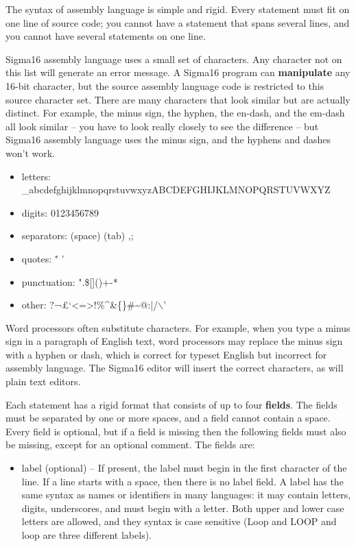 \documentclass[11pt]{article}
\begin{document}
\begin{itemize}
The syntax of assembly language is simple and rigid.  Every statement
must fit on one line of source code; you cannot have a statement that
spans several lines, and you cannot have several statements on one
line.

Sigma16 assembly language uses a small set of characters.  Any
character not on this list will generate an error message.  A Sigma16
program can \textbf{manipulate} any 16-bit character, but the source assembly
language code is restricted to this source character set.  There are
many characters that look similar but are actually distinct.  For
example, the minus sign, the hyphen, the en-dash, and the em-dash all
look similar -- you have to look really closely to see the difference
-- but Sigma16 assembly language uses the minus sign, and the hyphens
and dashes won't work.

\begin{itemize}
\item letters: \_abcdefghijklmnopqrstuvwxyzABCDEFGHIJKLMNOPQRSTUVWXYZ
\item digits: 0123456789
\item separators: (space) (tab) ,;
\item quotes: " '
\item punctuation: ".\$[]()+-*
\item other: ?¬£`<=>!\%\^{}\&\{\}\#\textasciitilde{}@:|/$\backslash$'
\end{itemize}

Word processors often substitute characters.  For example, when you
type a minus sign in a paragraph of English text, word processors may
replace the minus sign with a hyphen or dash, which is correct for
typeset English but incorrect for assembly language.  The Sigma16
editor will insert the correct characters, as will plain text editors.

Each statement has a rigid format that consists of up to four
\textbf{fields}.  The fields must be separated by one or more spaces, and a
field cannot contain a space.  Every field is optional, but if a field
is missing then the following fields must also be missing, except for
an optional comment.  The fields are:

\begin{itemize}
\item label (optional) -- If present, the label must begin in the first
character of the line.  If a line starts with a space, then there is
no label field.  A label has the same syntax as names or identifiers
in many languages: it may contain letters, digits, underscores, and
must begin with a letter.  Both upper and lower case letters are
allowed, and they syntax is case sensitive (Loop and LOOP and loop
are three different labels).


\end{itemize}
\end{itemize}
\end{document}
